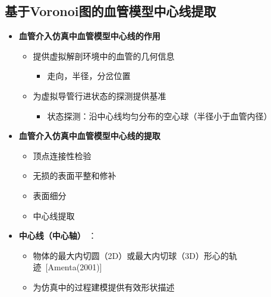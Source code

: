\subsection[中心线提取]{基于Voronoi图的血管模型中心线提取}

\begin{frame}
\begin{itemize}
\item \textbf{血管介入仿真中血管模型中心线的作用}
\begin{itemize}
\pause \item 提供虚拟解剖环境中的血管的几何信息
\begin{itemize}
\item 走向，半径，分岔位置
\end{itemize}
\pause \item 为虚拟导管行进状态的探测提供基准
\begin{itemize}
\item 状态探测：沿中心线均匀分布的空心球（半径小于血管内径）
\end{itemize}
\end{itemize}
\pause \item \textbf{血管介入仿真中血管模型中心线的提取}
\begin{itemize}
\pause \item 顶点连接性检验
\pause \item 无损的表面平整和修补
\pause \item 表面细分
\pause \item 中心线提取
\end{itemize}

\item \textbf{中心线（中心轴）} ： 
\begin{itemize}
\item 物体的最大内切圆（2D）或最大内切球（3D）形心的轨迹~[Amenta(2001)]
\item 为仿真中的过程建模提供有效形状描述
\end{itemize}
\end{itemize}
\end{frame}

